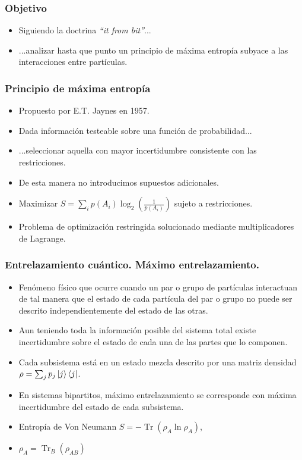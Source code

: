 \documentclass{beamer}
\DeclareMathOperator{\Tr}{Tr}
\begin{document}
\begin{frame}
\frametitle{Objetivo}
\begin{itemize}
	\item Siguiendo la doctrina \textit{``it from bit''}...
	\item ...analizar hasta que punto un principio de máxima entropía subyace a las interacciones entre partículas.
\end{itemize}
\end{frame}
\begin{frame}
\frametitle{Principio de máxima entropía}
\begin{itemize}
	\item Propuesto por E.T. Jaynes en 1957.
	\item Dada información testeable sobre una función de probabilidad...
	\item ...seleccionar aquella con mayor incertidumbre consistente con las restricciones.
	\item De esta manera no introducimos supuestos adicionales. 
	\item Maximizar \(S=\sum_{i}p(A_i)\log_2\left(\frac{1}{p(A_i)}\right) \) sujeto a restricciones.
	\item Problema de optimización restringida solucionado mediante multiplicadores de Lagrange.
	
\end{itemize}
\end{frame}


\begin{frame}
\frametitle{Entrelazamiento cuántico. Máximo entrelazamiento.}
\begin{itemize}
	\item Fenómeno físico que ocurre cuando un par o grupo de partículas interactuan de tal manera que el estado de cada partícula del par o grupo no puede ser descrito independientemente del estado de las otras.
	\item Aun teniendo toda la información posible del sistema total existe incertidumbre sobre el estado de cada una de las partes que lo componen.
	\item Cada subsistema está en un estado mezcla descrito por una matriz densidad \(\rho = \sum_{j}p_j\ket{j}\bra{j}
	 \).
	\item En sistemas bipartitos, máximo entrelazamiento se corresponde con máxima incertidumbre del estado de cada subsistema.
	\item Entropía de Von Neumann \(S=-\Tr(\rho_A\ln\rho_A)\),
	\item \(\rho_A = \Tr_B(\rho_{AB}) \)
	
	
\end{itemize}
\end{frame}
\end{document}
